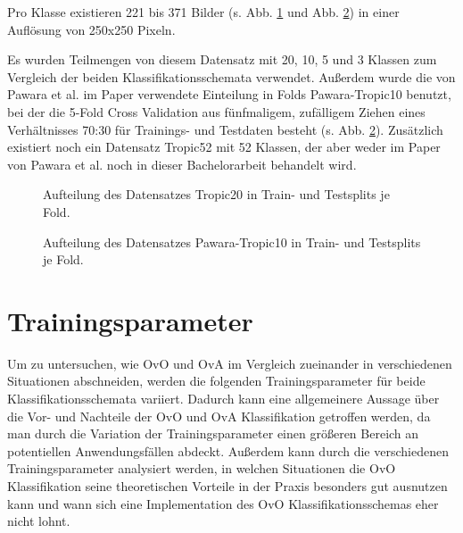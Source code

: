 Pro Klasse existieren 221 bis 371 Bilder (s. Abb. \ref{fig:tropic20Zusammensetzung} und Abb. \ref{fig:pawaraTropic10Zusammensetzung}) in einer Auflösung von 250x250 Pixeln.

Es wurden Teilmengen von diesem Datensatz mit 20, 10, 5 und 3 Klassen zum Vergleich der beiden Klassifikationsschemata verwendet. Außerdem wurde die von Pawara et al. im Paper \cite{pawaraPaper} verwendete Einteilung in Folds Pawara-Tropic10 \cite{pawaraWebsiteDatensaetze} benutzt, bei der die 5-Fold Cross Validation aus fünfmaligem, zufälligem Ziehen eines Verhältnisses 70:30 für Trainings- und Testdaten besteht (s. Abb. \ref{fig:pawaraTropic10Zusammensetzung}).
Zusätzlich existiert noch ein Datensatz Tropic52 \cite{pawaraWebsiteDatensaetze} mit 52 Klassen, der aber weder im Paper von Pawara et al. \cite{pawaraPaper} noch in dieser Bachelorarbeit behandelt wird.

\begin{figure}[H]
\begin{adjustbox}{width=1.2\textwidth, center}

\end{adjustbox}
\caption{Aufteilung des Datensatzes Tropic20 \cite{pawaraWebsiteDatensaetze} in Train- und Testsplits je Fold.}
\label{fig:tropic20Zusammensetzung}
\end{figure}
\begin{figure}[H]
\begin{adjustbox}{width=1.2\textwidth, center}

\end{adjustbox}
\caption{Aufteilung des Datensatzes Pawara-Tropic10 \cite{pawaraWebsiteDatensaetze} in Train- und Testsplits je Fold.}
\label{fig:pawaraTropic10Zusammensetzung}
\end{figure}


\section{Trainingsparameter}
\label{ch:methodik_parameter}
Um zu untersuchen, wie OvO und OvA im Vergleich zueinander in verschiedenen Situationen abschneiden, werden die folgenden Trainingsparameter für beide Klassifikationsschemata variiert.
Dadurch kann eine allgemeinere Aussage über die Vor- und Nachteile der OvO und OvA Klassifikation getroffen werden, da man durch die Variation der Trainingsparameter einen größeren Bereich an potentiellen Anwendungsfällen abdeckt.
Außerdem kann durch die verschiedenen Trainingsparameter analysiert werden, in welchen Situationen die OvO Klassifikation seine theoretischen Vorteile in der Praxis besonders gut ausnutzen kann und wann sich eine Implementation des OvO Klassifikationsschemas eher nicht lohnt.


